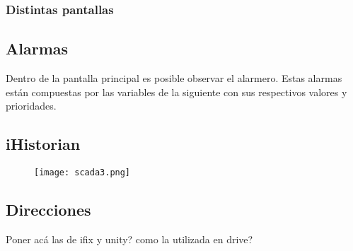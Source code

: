 \subsubsection{Distintas pantallas}


\subsection{Alarmas}
Dentro de la pantalla principal es posible observar el alarmero. Estas alarmas están compuestas por las variables de la siguiente  con sus respectivos valores y prioridades.\\
\subsection{iHistorian}
\begin{figure}[htb]
	\centering
	\texttt{[image: scada3.png]}
	\label{fig:scada3}
\end{figure}

\subsection{Direcciones}
Poner acá las de ifix y unity? como la utilizada en drive?